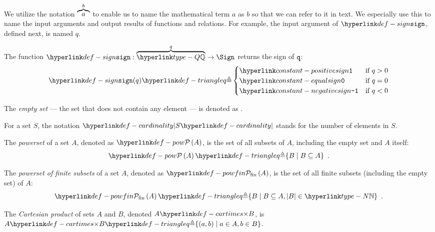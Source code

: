 We utilize the notation $\overbrace{a}^{b}$ to enable us to name the mathematical term $a$ as $b$ so that
we can refer to it in text. We especially use this to name the input arguments and
output results of functions and relations. For example, the input argument of $\sign$,
defined next, is named $q$.

\hypertarget{def-sign}{}
\begin{definition}
\hypertarget{constant-positivesign}{}
\hypertarget{constant-negativesign}{}
\hypertarget{constant-equalsign}{}

The function $\sign : \overname{\Q}{q} \rightarrow \Sign$ returns the sign of $\texttt{q}$:
\[
\sign(q) \triangleq \begin{cases}
  \positivesign & \text{if }q > 0\\
  \equalsign & \text{if }q = 0\\
  \negativesign & \text{if }q < 0
\end{cases}
\]
\end{definition}

\begin{definition}
  The \emph{empty set} --- the set that does not contain any element --- is denoted as .
\end{definition}

\hypertarget{def-cardinality}{}
\begin{definition}
  For a set $S$, the notation $\cardinality{S}$ stands for the number of elements in $S$.
\end{definition}

\hypertarget{def-pow}{}
\begin{definition}[Powerset]
The \emph{powerset} of a set $A$, denoted as $\pow{A}$, is the set of all subsets of $A$, including the empty set and $A$ itself:
\[
    \pow{A} \triangleq \{ B \;|\; B \subseteq A\} \enspace.
\]
\end{definition}

\hypertarget{def-powfin}{}
\begin{definition}
  The \emph{powerset of finite subsets} of a set $A$, denoted as $\powfin{A}$, is the set of all finite subsets (including the empty set) of $A$:
  \[
     \powfin{A} \triangleq \{ B \;|\; B \subseteq A, |B| \in \N\} \enspace.
  \]
\end{definition}

\hypertarget{def-cartimes}{}
\begin{definition}
    The \emph{Cartesian product} of sets $A$ and $B$, denoted $A \cartimes B$,
    is $A \cartimes B \triangleq \{(a,b) \;|\; a \in A, b \in B\}$.
\end{definition}

